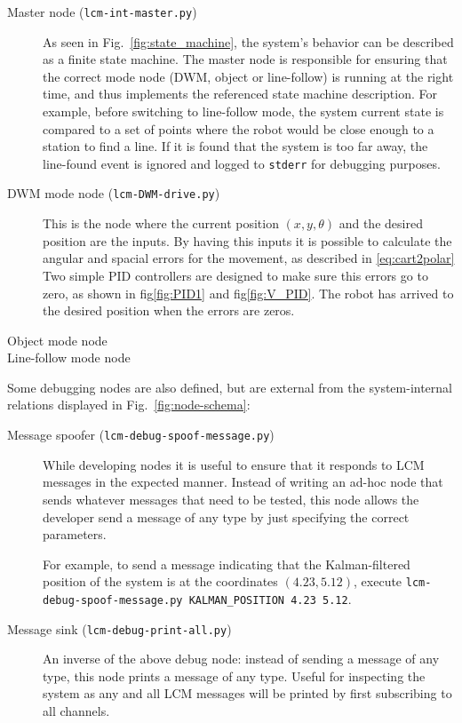 \begin{description}
\item[Master node (\texttt{lcm-int-master.py})]
  As seen in Fig.~\ref{fig:state_machine}, the system's behavior can be described as a finite state machine.
  The master node is responsible for ensuring that the correct mode node (DWM, object or line-follow) is running at the right time,
  and thus implements the referenced state machine description.
  For example, before switching to line-follow mode, the system current state is compared to a set of points where the robot would be close enough to a station to find a line.
  If it is found that the system is too far away, the line-found event is ignored and logged to \texttt{stderr} for debugging purposes.

\item[DWM mode node (\texttt{lcm-DWM-drive.py})]
This is the node where the current position $(x, y, \theta)$ and the desired position are the inputs.
By having this inputs it is possible to calculate the angular and spacial errors for the movement, as described in \eqref{eq:cart2polar}
Two simple PID controllers are designed to make sure this errors go to zero, as shown in fig\ref{fig:PID1} and fig\ref{fig:V_PID}.
The robot has arrived to the desired position when the errors are zeros.

\item[Object mode node]

\item[Line-follow mode node]

\end{description}

Some debugging nodes are also defined, but are external from the system-internal relations displayed in Fig.~\ref{fig:node-schema}:
\begin{description}
\item[Message spoofer (\texttt{lcm-debug-spoof-message.py})]
  While developing nodes it is useful to ensure that it responds to LCM messages in the expected manner.
  Instead of writing an ad-hoc node that sends whatever messages that need to be tested,
  this node allows the developer send a message of any type by just specifying the correct parameters.


  For example, to send a message indicating that the Kalman-filtered position of the system is at the coordinates $(4.23, 5.12)$,
  execute \texttt{lcm-debug-spoof-message.py KALMAN\_POSITION 4.23 5.12}.

\item[Message sink (\texttt{lcm-debug-print-all.py})]
  An inverse of the above debug node: instead of sending a message of any type,
  this node prints a message of any type.
  Useful for inspecting the system as any and all LCM messages will be printed by first subscribing to all channels.
\end{description}

